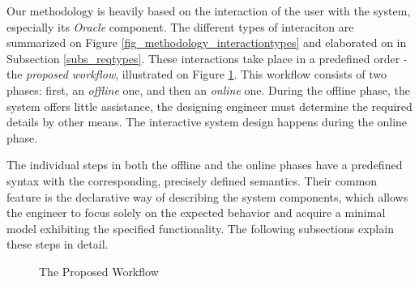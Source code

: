 Our methodology is heavily based on the interaction of the user with the system, especially its \textit{Oracle} component. The different types of interaciton are summarized on Figure \ref{fig_methodology_interactiontypes} and elaborated on in Subsection \ref{subs_reqtypes}. These interactions take place in a predefined order - the \textit{proposed workflow}, illustrated on Figure \ref{fig_methodology_workflow}. This workflow consists of two phases: first, an \textit{offline} one, and then an \textit{online} one. During the offline phase, the system offers little assistance, the designing engineer must determine the required details by other means. The interactive system design happens during the online phase. 

The individual steps in both the offline and the online phases have a predefined syntax with the corresponding, precisely defined semantics. Their common feature is the declarative way of describing the system components, which allows the engineer to focus solely on the expected behavior and acquire a minimal model exhibiting the specified functionality. The following subsections explain these steps in detail.

\begin{figure}[!ht] 
	\centering
	\caption{The Proposed Workflow} %
	\label{fig_methodology_workflow}
\end{figure}

